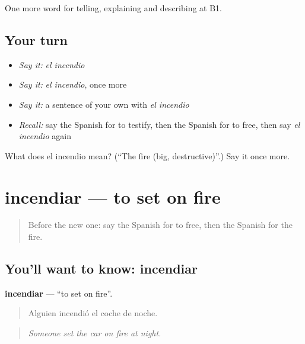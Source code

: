 \begin{grammarlens}[title={What you've built}]
One more word for telling, explaining and describing at B1.
\end{grammarlens}

\subsection*{Your turn}
\begin{itemize}
\raggedright
  \item \emph{Say it:} \emph{el incendio}
  \item \emph{Say it:} \emph{el incendio}, once more
  \item \emph{Say it:} a sentence of your own with \emph{el incendio}
  \item \emph{Recall:} say the Spanish for to testify, then the Spanish for to free, then say \emph{el incendio} again
\end{itemize}

\begin{tcolorbox}[breakable,colback=teal!4,colframe=teal!35!black,title={Before you move on}]
What does el incendio mean? (\textquotedblleft{}The fire (big, destructive)\textquotedblright{}.) Say it once more.
\end{tcolorbox}
\section[incendiar]{incendiar — to set on fire}

\label{lesson:ES-C524-incendiar}



\begin{quote}
Before the new one: say the Spanish for to free, then the Spanish for the fire.
\end{quote}

\subsection*{You'll want to know: incendiar}
\textbf{incendiar} — \textquotedblleft{}to set on fire\textquotedblright{}.

\begin{quote}
Alguien incendió el coche de noche.
\end{quote}

\begin{quote}
\emph{Someone set the car on fire at night.}
\end{quote}

